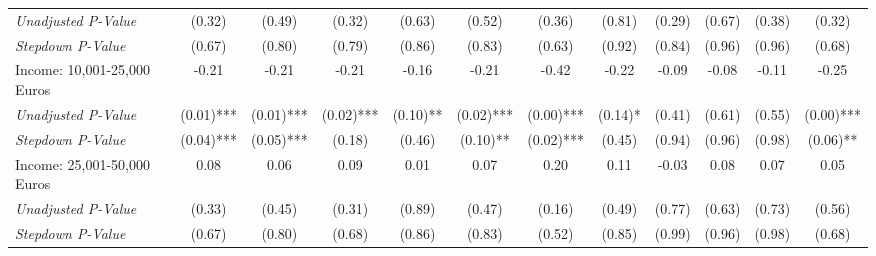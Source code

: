 \begin{tabular}{l c c c c c c c c c c c}
\quad \textit{Unadjusted P-Value} & (0.32) & (0.49) & (0.32) & (0.63) & (0.52) & (0.36) & (0.81) & (0.29) & (0.67) & (0.38) & (0.32) \\
\quad \textit{Stepdown P-Value} & (0.67) & (0.80) & (0.79) & (0.86) & (0.83) & (0.63) & (0.92) & (0.84) & (0.96) & (0.96) & (0.68) \\
Income: 10,001-25,000 Euros & -0.21 & -0.21 & -0.21 & -0.16 & -0.21 & -0.42 & -0.22 & -0.09 & -0.08 & -0.11 & -0.25 \\
\quad \textit{Unadjusted P-Value} & (0.01)*** & (0.01)*** & (0.02)*** & (0.10)** & (0.02)*** & (0.00)*** & (0.14)* & (0.41) & (0.61) & (0.55) & (0.00)*** \\
\quad \textit{Stepdown P-Value} & (0.04)*** & (0.05)*** & (0.18) & (0.46) & (0.10)** & (0.02)*** & (0.45) & (0.94) & (0.96) & (0.98) & (0.06)** \\
Income: 25,001-50,000 Euros & 0.08 & 0.06 & 0.09 & 0.01 & 0.07 & 0.20 & 0.11 & -0.03 & 0.08 & 0.07 & 0.05 \\
\quad \textit{Unadjusted P-Value} & (0.33) & (0.45) & (0.31) & (0.89) & (0.47) & (0.16) & (0.49) & (0.77) & (0.63) & (0.73) & (0.56) \\
\quad \textit{Stepdown P-Value} & (0.67) & (0.80) & (0.68) & (0.86) & (0.83) & (0.52) & (0.85) & (0.99) & (0.96) & (0.98) & (0.68) \\
\bottomrule
\end{tabular}
